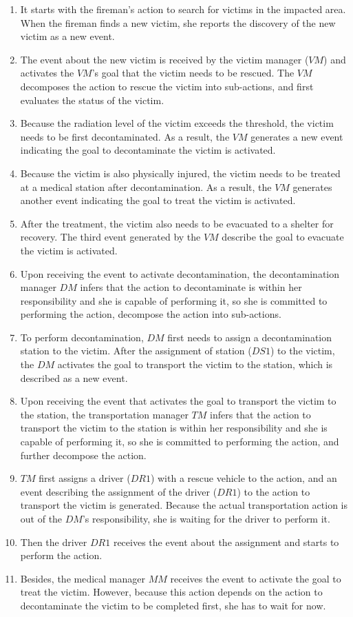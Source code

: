 \begin{enumerate}
	\item It starts with the fireman's action to search for victims in the impacted area. When the fireman finds a new victim, she reports the discovery of the new victim as a new event.
	\item The event about the new victim is received by the victim manager ($VM$) and activates the $VM$'s goal that the victim needs to be rescued. The $VM$ decomposes the action to rescue the victim into sub-actions, and first evaluates the status of the victim. 
	\item Because the radiation level of the victim exceeds the threshold, the victim needs to be first decontaminated. As a result, the $VM$ generates a new event indicating the goal to decontaminate the victim is activated.
	\item Because the victim is also physically injured, the victim needs to be treated at a medical station after decontamination. As a result, the $VM$ generates another event indicating the goal to treat the victim is activated.
	\item After the treatment, the victim also needs to be evacuated to a shelter for recovery. The third event generated by the $VM$ describe the goal to evacuate the victim is activated.
	\item Upon receiving the event to activate decontamination, the decontamination manager $DM$ infers that the action to decontaminate is within her responsibility and she is capable of performing it, so she is committed to performing the action, decompose the action into sub-actions.
	\item To perform decontamination, $DM$ first needs to assign a decontamination station to the victim. After the assignment of station ($DS1$) to the victim, the $DM$ activates the goal to transport the victim to the station, which is described as a new event.
	\item Upon receiving the event that activates the goal to transport the victim to the station, the transportation manager $TM$ infers that the action to transport the victim to the station is within her responsibility and she is capable of performing it, so she is committed to performing the action, and further decompose the action.
	\item $TM$ first assigns a driver ($DR1$) with a rescue vehicle to the action, and an event describing the assignment of the driver ($DR1$) to the action to transport the victim is generated. Because the actual transportation action is out of the $DM$’s responsibility, she is waiting for the driver to perform it.
	\item Then the driver $DR1$ receives the event about the assignment and starts to perform the action.
	\item Besides, the medical manager $MM$ receives the event to activate the goal to treat the victim. However, because this action depends on the action to decontaminate the victim to be completed first, she has to wait for now.
\end{enumerate}

